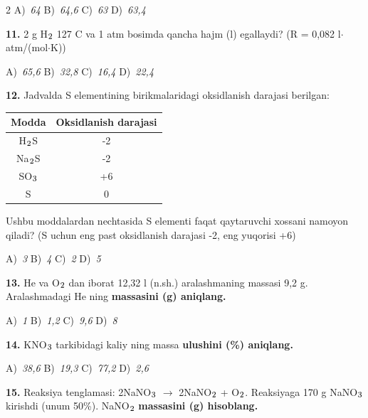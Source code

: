 \documentclass[11pt,a4paper]{article}
\renewcommand{\textsubscript}[1]{\ensuremath{_{\text{\fontsize{8}{8}\selectfont #1}}}}
\begin{document}
\begin{multicols}{2}
\noindent A)~\textsl{64} \hfill B)~\textsl{64,6} \hfill C)~\textsl{63} \hfill D)~\textsl{63,4}\par
\vspace{4pt}
\noindent\textbf{11.} 2 g H\textsubscript{2} 127 \textdegree{}C va 1 atm bosimda qancha hajm (l) egallaydi? (R = 0,082 l$\cdot$atm/(mol$\cdot$K))

\noindent A)~\textsl{65,6} \hfill B)~\textsl{32,8} \hfill C)~\textsl{16,4} \hfill D)~\textsl{22,4}\par
\vspace{4pt}
\noindent\textbf{12.} Jadvalda S elementining birikmalaridagi oksidlanish darajasi berilgan:
\begin{center}
\renewcommand{\arraystretch}{1.15}
\begin{tabular}{|c|c|}\hline
\textbf{Modda} & \textbf{Oksidlanish darajasi} \\ \hline
H\textsubscript{2}S & -2 \\ \hline
Na\textsubscript{2}S & -2 \\ \hline
SO\textsubscript{3} & +6 \\ \hline
S & 0 \\ \hline
\end{tabular}
\end{center}
Ushbu moddalardan nechtasida S elementi faqat qaytaruvchi xossani namoyon qiladi? (S uchun eng past oksidlanish darajasi -2, eng yuqorisi +6)

\noindent A)~\textsl{3} \hfill B)~\textsl{4} \hfill C)~\textsl{2} \hfill D)~\textsl{5}\par
\vspace{4pt}
\noindent\textbf{13.} He va O\textsubscript{2} dan iborat 12,32 l (n.sh.) aralashmaning massasi 9,2 g. Aralashmadagi He ning \textbf{massasini (g) aniqlang.}

\noindent A)~\textsl{1} \hfill B)~\textsl{1,2} \hfill C)~\textsl{9,6} \hfill D)~\textsl{8}\par
\vspace{4pt}
\noindent\textbf{14.} KNO\textsubscript{3} tarkibidagi kaliy ning massa \textbf{ulushini (\%) aniqlang.}

\noindent A)~\textsl{38,6} \hfill B)~\textsl{19,3} \hfill C)~\textsl{77,2} \hfill D)~\textsl{2,6}\par
\vspace{4pt}
\noindent\textbf{15.} Reaksiya tenglamasi: 2NaNO\textsubscript{3} $\to$ 2NaNO\textsubscript{2} + O\textsubscript{2}. Reaksiyaga 170 g NaNO\textsubscript{3} kirishdi (unum 50\%). NaNO\textsubscript{2} \textbf{massasini (g) hisoblang.}


\end{multicols}
\end{document}
